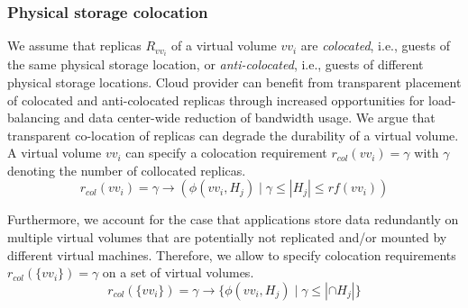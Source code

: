 \documentclass[conference]{IEEEtran}
\begin{document}
\subsubsection{Physical storage colocation}
We assume that replicas $R_{vv_i}$ of a virtual volume $vv_i$ are \textit{colocated}, i.e., guests of the same physical storage location, or \textit{anti-colocated}, i.e., guests of different physical storage locations. Cloud provider can benefit from transparent placement of colocated and anti-colocated replicas through increased opportunities for load-balancing and data center-wide reduction of bandwidth usage. We argue that transparent co-location of replicas can degrade the durability of a virtual volume. A virtual volume $vv_i$ can specify a colocation requirement $r_{col}(vv_i)=\gamma$ with $\gamma$ denoting the number of collocated replicas. 
\begin{equation}
r_{col}(vv_i)=\gamma \rightarrow ( \phi(vv_i, H_j) \mid \gamma \leq \left\vert H_j \right\vert \leq rf(vv_i))
\end{equation}

Furthermore, we account for the case that applications store data redundantly on multiple virtual volumes that are potentially not replicated and/or mounted by different virtual machines. Therefore, we allow to specify colocation requirements $r_{col}(\{vv_i\})=\gamma$ on a set of virtual volumes.
\begin{equation}
r_{col}( \{ vv_i \} ) = \gamma \rightarrow \{ \phi(vv_i, H_j) \mid \gamma \leq \left\vert \cap H_j \right\vert \}
\end{equation}
\end{document}
